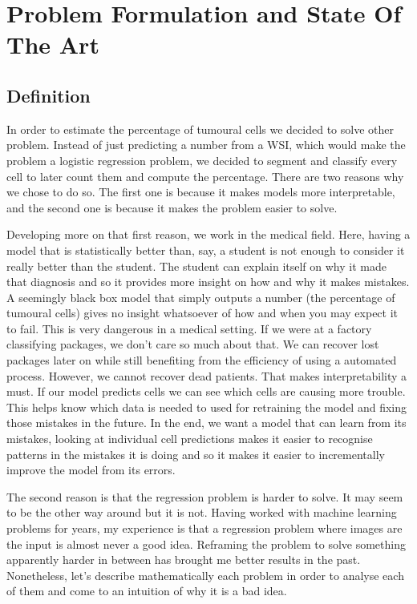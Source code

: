 \chapter{Problem Formulation and State Of The Art}

\section{Definition}

In order to estimate the percentage of tumoural cells we decided to solve other problem. Instead of just predicting a number from a WSI, which would make the problem a logistic regression problem, we decided to segment and classify every cell to later count them and compute the percentage. There are two reasons why we chose to do so. The first one is because it makes models more interpretable, and the second one is because it makes the problem easier to solve.

Developing more on that first reason, we work in the medical field. Here, having a model that is statistically better than, say, a student is not enough to consider it really better than the student. The student can explain itself on why it made that diagnosis and so it provides more insight on how and why it makes mistakes. A seemingly black box model that simply outputs a number (the percentage of tumoural cells) gives no insight whatsoever of how and when you may expect it to fail. This is very dangerous in a medical setting. If we were at a factory classifying packages, we don't care so much about that. We can recover lost packages later on while still benefiting from the efficiency of using a automated process. However, we cannot recover dead patients. That makes interpretability a must. If our model predicts cells we can see which cells are causing more trouble. This helps know which data is needed to used for retraining the model and fixing those mistakes in the future. In the end, we want a model that can learn from its mistakes, looking at individual cell predictions makes it easier to recognise patterns in the mistakes it is doing and so it makes it easier to incrementally improve the model from its errors.

The second reason is that the regression problem is harder to solve. It may seem to be the other way around but it is not. Having worked with machine learning problems for years, my experience is that a regression problem where images are the input is almost never a good idea. Reframing the problem to solve something apparently harder in between has brought me better results in the past. Nonetheless, let's describe mathematically each problem in order to analyse each of them and come to an intuition of why it is a bad idea.


